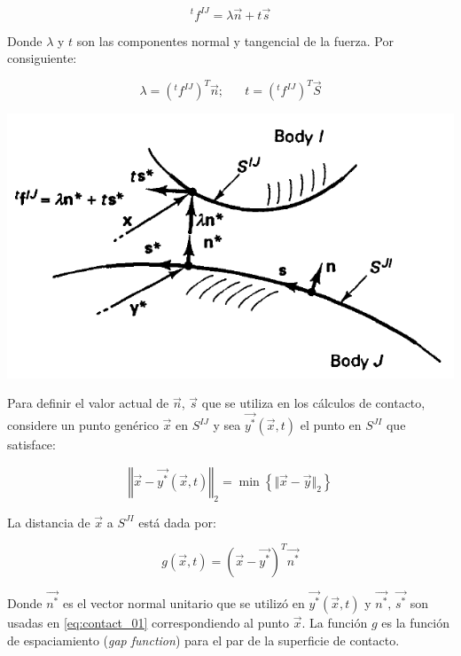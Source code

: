 \begin{equation} \label{eq:contact_01}
^tf^{IJ} = \lambda \vec{n} + t \vec{s}
\end{equation}

Donde $\lambda$ y $t$ son las componentes normal y tangencial de la fuerza. Por consiguiente:

\begin{equation}
\lambda = \left( ^tf^{IJ} \right)^T \vec{n}; \,\,\,\,\,\,\,\,\,\, t = \left( ^tf^{IJ} \right)^T \vec{S}
\end{equation}

\begin{center}
\includegraphics[scale=0.65]{src/ch2/contact_analysis.png}
\label{fig:contact_analysis}
\end{center}

Para definir el valor actual de $\vec{n}$,  $\vec{s}$ que se utiliza en los cálculos de contacto, 
considere un punto genérico $\vec{x}$ en $S^{IJ}$ y sea $\vec{y^{\ast}}(\vec{x}, t)$ el punto en $S^{JI}$ 
que satisface: ~\cite{bathe1996}

\begin{equation}
\left\Vert \vec{x} - \vec{y^{\ast}}(\vec{x}, t) \right\Vert_2 = \min \left\{ \Vert \vec{x} - \vec{y} \Vert_2 \right\}
\end{equation}

La distancia de $\vec{x}$ a $S^{JI}$ está dada por:

\begin{equation}
g(\vec{x}, t) = (\vec{x} - \vec{y^{\ast}})^T \vec{n^{\ast}}
\end{equation}

Donde $\vec{n^{\ast}}$ es el vector normal unitario que se utilizó en $\vec{y^{\ast}}(\vec{x}, t)$ y 
$\vec{n^{\ast}}, \, \vec{s^{\ast}}$ son usadas en \ref{eq:contact_01} correspondiendo al punto 
$\vec{x}$. La función $g$ es la función de espaciamiento (\textit{gap function}) para el par 
de la superficie de contacto.\\

